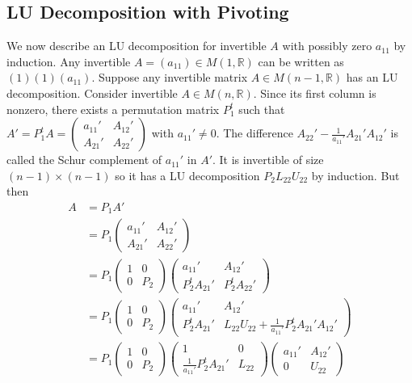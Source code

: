 \documentclass[12pt]{amsart}
\theoremstyle{definition}
\begin{document}
\subsection{LU Decomposition with Pivoting} We now describe an LU decomposition for invertible $A$ with possibly zero $a_{11}$ by induction. Any invertible $A = (a_{11}) \in M(1, \mathbb{R})$ can be written as $(1) (1)(a_{11})$. Suppose any invertible matrix $A \in M(n-1, \mathbb{R})$ has an LU decomposition. Consider invertible $A \in M(n, \mathbb{R})$. Since its first column is nonzero, there exists a permutation matrix $P^t_1$ such that $A' = P^t_1A = \left(\begin{array}{cc} a_{11}' & A_{12}' \\ A_{21}' & A_{22}' \end{array}\right)$ with $a_{11}' \neq 0$. The difference $A_{22}' - \frac{1}{a_{11}'}A_{21}'A_{12}'$ is called the Schur complement of $a_{11}'$ in $A'$. It is invertible of size $(n-1) \times (n-1)$ so it has a LU decomposition $P_2L_{22}U_{22}$ by induction. But then
\begin{align*}
A & = P_1A' \\
 & = P_1\left(\begin{array}{cc} a_{11}' & A_{12}' \\ A_{21}' & A_{22}' \end{array}\right) \\
 & = P_1\left(\begin{array}{cc} 1 & 0 \\ 0 & P_2 \end{array}\right)\left(\begin{array}{cc} a_{11}' & A_{12}' \\ P^t_2A_{21}' & P^t_2 A_{22}' \end{array}\right) \\
 & = P_1 \left(\begin{array}{cc} 1 & 0 \\ 0 & P_2  \end{array}\right)\left(\begin{array}{cc} a_{11}' & A_{12}' \\ P^t_2A_{21}' & L_{22}U_{22} + \frac{1}{a_{11}'} P^t_2 A_{21}' A_{12}'  \end{array}\right) \\
 & = P_1 \left(\begin{array}{cc} 1 & 0 \\ 0 & P_2  \end{array}\right) \left(\begin{array}{cc} 1 & 0 \\ \frac{1}{a_{11}'} P^t_2 A_{21}' & L_{22}  \end{array}\right)\left(\begin{array}{cc} a_{11}' & A_{12}' \\ 0 & U_{22}  \end{array}\right)
\end{align*}
\end{document}
